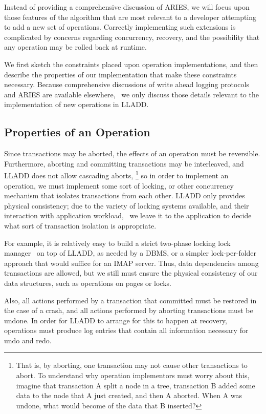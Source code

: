 \documentclass[letterpaper,english]{article}
\begin{document}
\begin{enumerate}
\begin{enumerate}
\begin{enumerate}
Instead of providing a comprehensive discussion of ARIES, we will
focus upon those features of the algorithm that are most relevant
to a developer attempting to add a new set of operations. Correctly
implementing such extensions is complicated by concerns regarding
concurrency, recovery, and the possibility that any operation may
be rolled back at runtime.

We first sketch the constraints placed upon operation implementations,
and then describe the properties of our implementation that
make these constraints necessary. Because comprehensive discussions of
write ahead logging protocols and ARIES are available elsewhere,~\cite{haerder, aries} we
only discuss those details relevant to the implementation of new
operations in LLADD.


\subsection{Properties of an Operation\label{sub:OperationProperties}}


Since transactions may be aborted,
the effects of an operation must be reversible. Furthermore, aborting
and committing transactions may be interleaved, and LLADD does not
allow cascading aborts,%
\footnote{That is, by aborting, one transaction may not cause other transactions
to abort. To understand why operation implementors must worry about
this, imagine that transaction A split a node in a tree, transaction
B added some data to the node that A just created, and then A aborted.
When A was undone, what would become of the data that B inserted?%
} so in order to implement an operation, we must implement some sort
of locking, or other concurrency mechanism that isolates transactions
from each other. LLADD only provides physical consistency; due to the variety of locking systems available, and their interaction with application workload,~\cite{multipleGenericLocking} we leave
it to the application to decide what sort of transaction isolation is
appropriate.  

For example, it is relatively easy to
build a strict two-phase locking lock manager~\cite{hierarcicalLocking} on top of LLADD, as
needed by a DBMS, or a simpler lock-per-folder approach that would
suffice for an IMAP server.  Thus, data dependencies among
transactions are allowed, but we still must ensure the physical
consistency of our data structures, such as operations on pages or locks.

Also, all actions performed by a transaction that committed must be
restored in the case of a crash, and all actions performed by aborting
transactions must be undone. In order for LLADD to arrange for this
to happen at recovery, operations must produce log entries that contain
all information necessary for undo and redo.


\end{enumerate}
\end{enumerate}
\end{enumerate}
\end{document}
